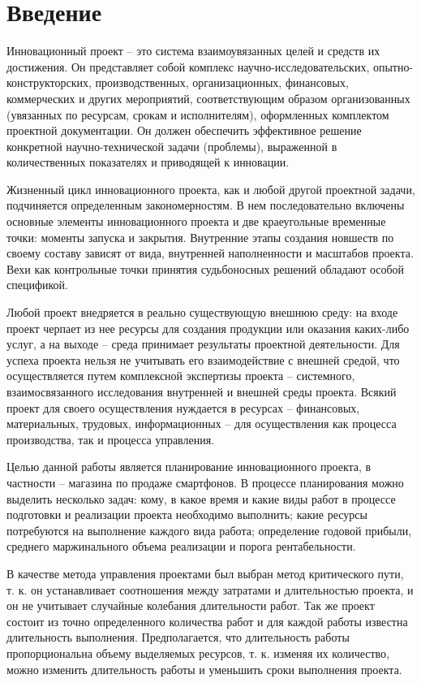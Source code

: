 \Large
\newpage
\section*{Введение}

Инновационный проект – это система взаимоувязанных целей и средств их достижения. Он представляет собой комплекс научно-исследовательских, опытно-конструкторских, производственных, организационных, финансовых, коммерческих и других мероприятий, соответствующим образом организованных (увязанных по ресурсам, срокам и исполнителям), оформленных комплектом проектной документации. Он должен обеспечить эффективное решение конкретной научно-технической задачи (проблемы), выраженной в количественных показателях и приводящей к инновации.

Жизненный цикл инновационного проекта, как и любой другой проектной задачи, подчиняется определенным закономерностям. В нем последовательно включены основные элементы инновационного проекта и две краеугольные временные точки: моменты запуска и закрытия. Внутренние этапы создания новшеств по своему составу зависят от вида, внутренней наполненности и масштабов проекта. Вехи как контрольные точки принятия судьбоносных решений обладают особой спецификой.

Любой проект внедряется в реально существующую внешнюю среду: на
входе проект черпает из нее ресурсы для создания продукции или оказания
каких-либо услуг, а на выходе – среда принимает результаты проектной
деятельности. Для успеха проекта нельзя не учитывать его взаимодействие с
внешней средой, что осуществляется путем комплексной экспертизы проекта –
системного, взаимосвязанного исследования внутренней и внешней среды
проекта. Всякий проект для своего осуществления нуждается в ресурсах –
финансовых, материальных, трудовых, информационных – для осуществления
как процесса производства, так и процесса управления.

Целью данной работы является планирование инновационного проекта, в
частности – магазина по продаже смартфонов. В процессе планирования можно
выделить несколько задач: кому, в какое время и какие виды работ в процессе
подготовки и реализации проекта необходимо выполнить; какие ресурсы
потребуются на выполнение каждого вида работа; определение годовой
прибыли, среднего маржинального объема реализации и порога
рентабельности.

В качестве метода управления проектами был выбран метод критического
пути, т. к. он устанавливает соотношения между затратами и длительностью
проекта, и он не учитывает случайные колебания длительности работ. Так же
проект состоит из точно определенного количества работ и для каждой работы
известна длительность выполнения. Предполагается, что длительность работы
пропорциональна объему выделяемых ресурсов, т. к. изменяя их количество,
можно изменить длительность работы и уменьшить сроки выполнения проекта.
\newpage
